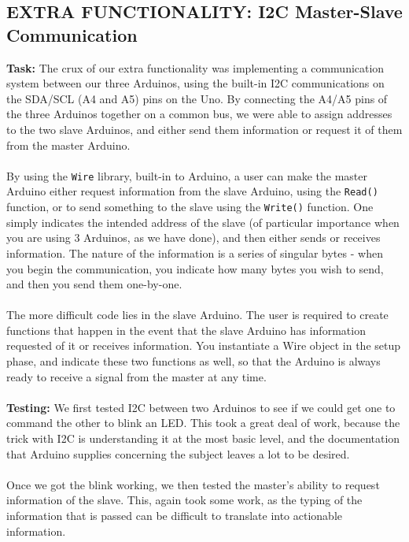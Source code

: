 \documentclass[paper=a4, fontsize=11pt]{scrartcl}
\numberwithin{equation}{section}		%
\numberwithin{figure}{section}			%
\numberwithin{table}{section}				%
\begin{document}
{\subsection{EXTRA FUNCTIONALITY: I2C Master-Slave Communication}
\textbf{Task: }The crux of our extra functionality was implementing a communication system between our three Arduinos, using the built-in I2C communications on the SDA/SCL (A4 and A5) pins on the Uno. By connecting the A4/A5 pins of the three Arduinos together on a common bus, we were able to assign addresses to the two slave Arduinos, and either send them information or request it of them from the master Arduino.
\\\\
By using the \texttt{Wire} library, built-in to Arduino, a user can make the master Arduino either request information from the slave Arduino, using the \texttt{Read()} function, or to send something to the slave using the \texttt{Write()} function. One simply indicates the intended address of the slave (of particular importance when you are using 3 Arduinos, as we have done), and then either sends or receives information. The nature of the information is a series of singular bytes - when you begin the communication, you indicate how many bytes you wish to send, and then you send them one-by-one.
\\\\
The more difficult code lies in the slave Arduino. The user is required to create functions that happen in the event that the slave Arduino has information requested of it or receives information. You instantiate a Wire object in the setup phase, and indicate these two functions as well, so that the Arduino is always ready to receive a signal from the master at any time.
\\\\
\textbf{Testing: } We first tested I2C between two Arduinos to see if we could get one to command the other to blink an LED. This took a great deal of work, because the trick with I2C is understanding it at the most basic level, and the documentation that Arduino supplies concerning the subject leaves a lot to be desired. 
\\\\
Once we got the blink working, we then tested the master's ability to request information of the slave. This, again took some work, as the typing of the information that is passed can be difficult to translate into actionable information.
\\\\
}
\end{document}
